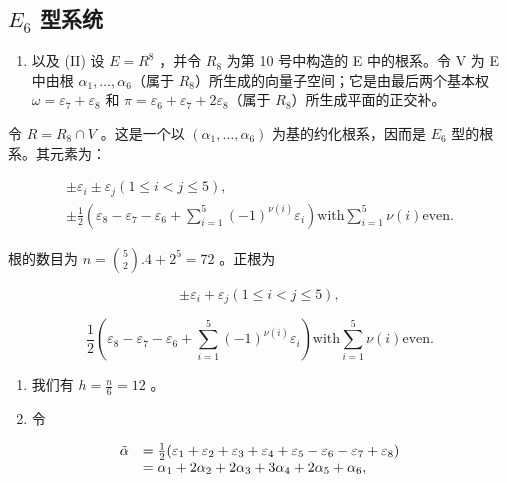 \subsection{\texorpdfstring{\(E_{6}\) 型系统}{E\_6 型系统}}

\begin{enumerate}
\def\labelenumi{(\Roman{enumi})}
\tightlist
\item
  以及 (II) 设 \(E = R^{8}\) ，并令 \(R_{8}\) 为第 10 号中构造的 E 中的根系。令 V 为 E 中由根 \(\alpha_{1}, \ldots, \alpha_{6}\)（属于 \(R_{8}\)）所生成的向量子空间；它是由最后两个基本权 \(\omega = \varepsilon_{7} + \varepsilon_{8}\) 和 \(\pi = \varepsilon_{6} + \varepsilon_{7} + 2\varepsilon_{8}\)（属于 \(R_{8}\)）所生成平面的正交补。
\end{enumerate}

令 \(R = R_{8} \cap V\) 。这是一个以 \((\alpha_{1}, \ldots, \alpha_{6})\) 为基的约化根系，因而是 \(E_{6}\) 型的根系。其元素为：

\[
\begin{array}{c} \pm \varepsilon_ {i} \pm \varepsilon_ {j} (1 \leqslant i <   j \leqslant 5), \\ \pm \frac {1}{2} (\varepsilon_ {8} - \varepsilon_ {7} - \varepsilon_ {6} + \sum_ {i = 1} ^ {5} (- 1) ^ {\nu (i)} \varepsilon_ {i}) \text {with} \sum_ {i = 1} ^ {5} \nu (i) \text {even.} \end{array}
\]

根的数目为 \(n = \binom{5}{2}.4 + 2^5 = 72\) 。正根为

\[
\pm \varepsilon_ {i} + \varepsilon_ {j} (1 \leqslant i <   j \leqslant 5),
\]

\[
\frac {1}{2} \left(\varepsilon_ {8} - \varepsilon_ {7} - \varepsilon_ {6} + \sum_ {i = 1} ^ {5} (- 1) ^ {\nu (i)} \varepsilon_ {i}\right) \text {with} \sum_ {i = 1} ^ {5} \nu (i) \text {even}.
\]

\begin{enumerate}
\def\labelenumi{(\Roman{enumi})}
\setcounter{enumi}{2}
\item
  我们有 \(h = \frac{n}{6} = 12\) 。
\item
  令
\end{enumerate}

\[
\begin{array}{r l} \tilde {\alpha} & = \frac {1}{2} (\varepsilon_ {1} + \varepsilon_ {2} + \varepsilon_ {3} + \varepsilon_ {4} + \varepsilon_ {5} - \varepsilon_ {6} - \varepsilon_ {7} + \varepsilon_ {8}) \\ & = \alpha_ {1} + 2 \alpha_ {2} + 2 \alpha_ {3} + 3 \alpha_ {4} + 2 \alpha_ {5} + \alpha_ {6}, \end{array}
\]


